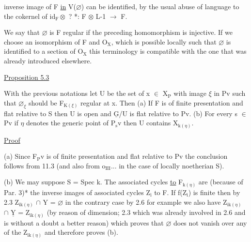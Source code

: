 
inverse image of F \uline{in} V($\varnothing$) can be identified, by the usual abuse
of language to the cokernel of id$_{\mathrm{F}}\otimes$ ? *: F $\otimes$ L-1 $\rightarrow$ F.

We say that $\varnothing$ is F regular if\unsure{,|\hand{,}} the preceding homomorphism is
injective.  If we choose an isomorphism of F and O$_{\mathrm{X}}$, which is
possible locally such that $\varnothing$ is identified to a section of O$_{\mathrm{X}}$ this
terminology is compatible with the one that was already introduced
elsewhere.

\uline{Proposition 5.3}

With the previous notations let U be the set of x $\in$ X$_{\mathrm{P}}$ with
image $\xi$ in Pv such that $\varnothing_{\xi}$ should be F$_{\mathrm{K}(\xi)}$ regular at x.  Then (a)
If F is of finite presentation and flat relative to S then U is
open and $\underline{\mathrm{G}}$/U is flat relative to Pv.  (b) For every s $\in$ Pv if $\eta$
denotes the generic point of P$_{\mathrm{s}}$v then U contains X$_{\mathrm{k}(\eta)}$.

\uline{Proof}

(a) Since F$_{\mathrm{P}}$v is of finite presentation and flat relative to
Pv the conclusion follows from 11.3 (and also from o$_{\mathrm{III}}$... in the
case of locally noetherian S).

(b) We may suppose S = Spec k.  The associated cycles \uline{to} F$_{\mathrm{k}(\eta)}$
are (because of Par. 3)* the inverse images of associated cycles
Z$_{\mathrm{i}}$ to F.  If f(Z$_{\mathrm{i}}$) is finite then by 2.3 Z$_{\mathrm{ik}(\eta)}$ $\cap$ Y = $\varnothing$ in the
contrary case by 2.6 for example we also have Z$_{\mathrm{ik}(\eta)}$ $\cap$ $\underline{\mathrm{Y}}$ = Z$_{\mathrm{ik}(\eta)}$
(by reason of dimension; 2.3 which was already involved in 2.6 and
is without a doubt a better reason) which proves that $\varnothing$ does not
vanish over any of the Z$_{\mathrm{ik}(\eta)}$ and therefore proves (b).

